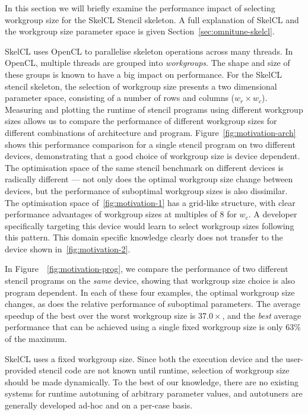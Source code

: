 \documentclass[nonatbib,preprint,9pt]{sigplanconf}
\begin{document}
In this section we will briefly examine the performance impact of
selecting workgroup size for the SkelCL Stencil skeleton. A full
explanation of SkelCL and the workgroup size parameter space is given
Section~\ref{sec:omnitune-skelcl}.

SkelCL uses OpenCL to parallelise skeleton operations across many
threads. In OpenCL, multiple threads are grouped into
\emph{workgroups}. The shape and size of these groups is known to have
a big impact on performance. For the SkelCL stencil skeleton, the
selection of workgroup size presents a two dimensional parameter
space, consisting of a number of rows and columns ($w_r \times w_c$).
Measuring and plotting the runtime of stencil programs using different
workgroup sizes allows us to compare the performance of different
workgroup sizes for different combinations of architecture and
program. Figure~\ref{fig:motivation-arch} shows this performance
comparison for a single stencil program on two different devices,
demonstrating that a good choice of workgroup size is device
dependent. The optimisation space of the same stencil benchmark on
different devices is radically different --- not only does the optimal
workgroup size change between devices, but the performance of
suboptimal workgroup sizes is also dissimilar. The optimisation space
of~\ref{fig:motivation-1} has a grid-like structure, with clear
performance advantages of workgroup sizes at multiples of 8 for
$w_c$. A developer specifically targeting this device would learn to
select workgroup sizes following this pattern. This domain specific
knowledge clearly does not transfer to the device shown
in~\ref{fig:motivation-2}.

In Figure~~\ref{fig:motivation-prog}, we compare the performance of
two different stencil programs on the \emph{same} device, showing that
workgroup size choice is also program dependent. In each of these four
examples, the optimal workgroup size changes, as does the relative
performance of suboptimal parameters. The average speedup of the best
over the worst workgroup size is $37.0\times$, and the \emph{best}
average performance that can be achieved using a single fixed
workgroup size is only 63\% of the maximum.

SkelCL uses a fixed workgroup size. Since both the execution device
and the user-provided stencil code are not known until runtime,
selection of workgroup size should be made dynamically. To the best of
our knowledge, there are no existing systems for runtime autotuning of
arbitrary parameter values, and autotuners are generally developed
ad-hoc and on a per-case basis.
\end{document}
